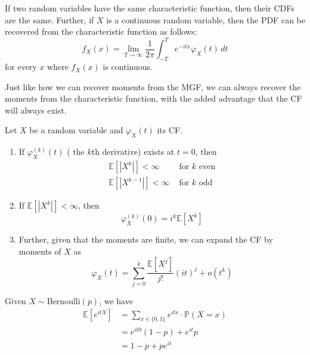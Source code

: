 \documentclass{article}
\begin{document}
      \begin{theorem}
        If two random variables have the same characteristic function, then their CDFs are the same. Further, if $X$ is a continuous random variable, then the PDF can be recovered from the characteristic function as follows: 
        \begin{equation}
          f_X (x) = \lim_{T \rightarrow \infty} \frac{1}{2 \pi} \int_{-T}^T e^{- i t x} \varphi_X (t) \,dt
        \end{equation}
        for every $x$ where $f_X (x)$ is continuous. 
      \end{theorem}

      Just like how we can recover moments from the MGF, we can always recover the moments from the characteristic function, with the added advantage that the CF will always exist. 

      \begin{theorem}
        Let $X$ be a random variable and $\varphi_X (t)$ its CF. 
        \begin{enumerate}
          \item If $\varphi_X^{(k)} (t)$ ( the $k$th derivative) exists at $t = 0$, then 
          \begin{align*}
            \mathbb{E}[|X^k|] < \infty & \text{ for } k \text{ even} \\
            \mathbb{E}[|X^{k-1}|] < \infty & \text{ for } k \text{ odd}
          \end{align*}
          
          \item If $\mathbb{E}[|X^k|] < \infty$, then 
          \begin{equation}
            \varphi_X^{(k)} (0) = i^k \mathbb{E}[X^k]
          \end{equation}
          
          \item Further, given that the moments are finite, we can expand the CF by moments of $X$ as 
          \begin{equation}
            \varphi_X (t) = \sum_{j=0}^k \frac{\mathbb{E}[X^j]}{j!} (i t)^j + o(t^k)
          \end{equation}
        \end{enumerate}
      \end{theorem}

      \begin{example}[Bernoulli]
        Given $X \sim \mathrm{Bernoulli}(p)$, we have 
        \begin{align*}
          \mathbb{E}[ e^{i t X}] & = \sum_{x \in \{0, 1\}} e^{i t x} \cdot \mathbb{P}(X = x) \\
          & = e^{i t 0} (1 - p) + e^{i t} p \\
          & = 1 - p + p e^{i t}
        \end{align*}
      \end{example}
\end{document}
